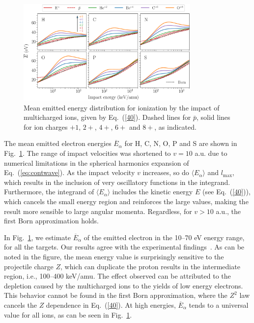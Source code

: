\documentclass[10pt,showpacs,twocolumn]{revtex4}
\begin{document}
\begin{figure}[t!]
\centering
\includegraphics[width=0.8\textwidth]{figuras/ener_mean.eps}
\caption{Mean emitted energy distribution for ionization by the impact 
of multicharged ions, given by Eq.~(\ref{40}). Dashed lines for $\bar{p}$,
solid lines for ion charges $+1$, $2+$, $4+$, $6+$ and $8+$,
as indicated.}
\label{fig:emittedener}
\end{figure} 

The mean emitted electron energies $\overline{E}_{\alpha}$ for H, C, N, 
O, P and S are shown in Fig.~\ref{fig:emittedener}. The range of impact 
velocities was shortened to $v=10$ a.u. due to numerical limitations 
in the spherical harmonics expansion of Eq.~(\ref{eq:contwave}). 
As the impact velocity $v$ increases, so do $\langle E_{\alpha}\rangle$
and $l_{\max}$, which results in the inclusion of very oscillatory 
functions in the integrand. Furthermore, the integrand of
$\langle E_{\alpha}\rangle$ includes the kinetic energy $E$
(see Eq.~(\ref{40})), which cancels the small energy region and 
reinforces the large values, making the result more sensible to large
angular momenta. Regardless, for $v>10$ a.u., the first Born 
approximation holds.

In Fig.~\ref{fig:emittedener}, we estimate $\overline{E}_{\alpha}$ of
the emitted electron in the 10--70 eV energy range,
for all the targets. Our results agree with the 
experimental findings~\cite{surdutovic2018}. As can be noted in the 
figure, the mean energy value is surprisingly sensitive to the 
projectile charge $Z$, which can duplicate the proton results in the 
intermediate region, i.e., 100--400 keV/amu. The effect observed can be 
attributed to the depletion caused by the multicharged ions to the 
yields of low energy electrons. This behavior cannot be found in the 
first Born approximation, where the $Z^2$ law cancels the $Z$ dependence
in Eq.~(\ref{40}). At high energies, $\overline{E}_{\alpha}$ tends to a 
universal value for all ions, as can be seen in Fig.~\ref{fig:emittedener}.
\end{document}
